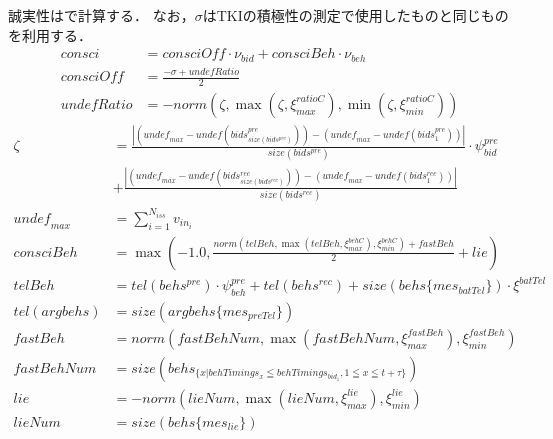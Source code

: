 誠実性はで計算する．
なお，$\sigma$はTKIの積極性の測定で使用したものと同じものを利用する．
\begin{align}
    consci &= \mathit{consciOff} \cdot \nu_{\mathit{bid}} + consciBeh \cdot \nu_{beh} \label{eq:conscientiousness} \\
    \mathit{consciOff} &= \frac{-\sigma + \mathit{undefRatio}}{2} \nonumber \\
    \mathit{undefRatio} &= -norm \left(\zeta, \max \left(\zeta, \xi_{max}^{ratioC} \right), \min \left(\zeta, \xi_{min}^{ratioC}\right) \right) \nonumber 
\end{align}
\begin{align}
    \zeta &= \frac{\left| \left(\mathit{undef_{max}} - \mathit{undef}\left(bids^{pre}_{size(bids^{pre})}\right) \right) - \left(\mathit{undef_{max}} - \mathit{undef}\left(bids^{pre}_1\right) \right) \right|}{size(bids^{pre})} \cdot \psi_{\mathit{bid}}^{pre} \nonumber \\
    &+ \frac{\left|\left(\mathit{undef_{max}} - \mathit{undef}\left(bids^{rec}_{size(bids^{rec})}\right) \right) - \left(\mathit{undef_{max}} - \mathit{undef}\left(bids^{rec}_1\right) \right) \right|}{size(bids^{rec})} \nonumber \\
    \mathit{undef_{max}} &= \sum_{i=1}^{N_{iss}} v_{in_i} \nonumber \\
    consciBeh &= \max \left( -1.0, \frac{norm\left( \mathit{telBeh}, \max \left( \mathit{telBeh}, \xi_{max}^{\mathit{behC}}\right), \xi_{min}^{\mathit{behC}} \right) + \mathit{fastBeh}}{2} + \mathit{lie}\right) \nonumber \\
    telBeh &=  tel(behs^{pre}) \cdot \psi_{beh}^{pre} + tel(behs^{rec}) + size(behs\{mes_{\mathit{batTel}}\}) \cdot \xi^{batTel} \nonumber \\
    tel(argbehs) &= size(argbehs\{mes_{\mathit{preTel}}\}) \nonumber \\
    \mathit{fastBeh} &= norm\left( \mathit{fastBehNum}, \max \left( \mathit{fastBehNum}, \xi_{max}^{\mathit{fastBeh}}\right), \xi_{min}^{\mathit{fastBeh}} \right) \nonumber \\
    \mathit{fastBehNum} &= size \left( behs_{\{x | behTimings_x \leqq behTimings_{bid_1}, 1 \leqq x \leqq t + \tau \}} \right) \nonumber \\
    \mathit{lie} &= -norm\left( \mathit{lieNum}, \max \left( \mathit{lieNum}, \xi_{max}^{\mathit{lie}}\right), \xi_{min}^{\mathit{lie}} \right) \nonumber \\
    \mathit{lieNum} &= size(behs\{mes_{\mathit{lie}}\}) \nonumber
\end{align}

